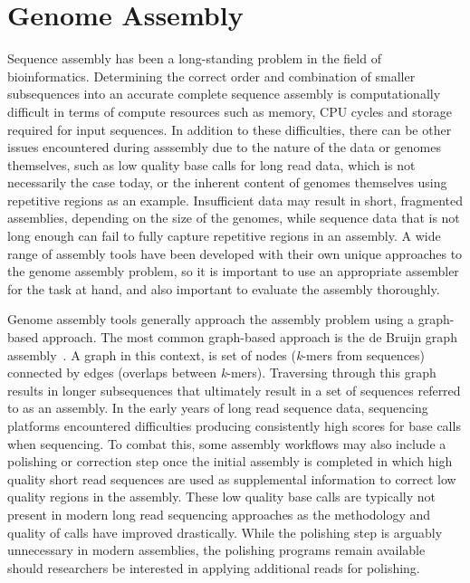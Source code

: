 \section{Genome Assembly}

Sequence assembly has been a long-standing problem in the field of
bioinformatics\cite{Nagarajan2013}. Determining the correct order and
combination of smaller subsequences into an accurate complete sequence
assembly is computationally difficult in terms of compute resources
such as memory, CPU cycles and storage required for input
sequences\cite{Nagarajan2013}. In addition to these difficulties,
there can be other issues encountered during asssembly due to the
nature of the data or genomes themselves, such as low quality base
calls for long read data, which is not necessarily the case today, or
the inherent content of genomes themselves using repetitive regions as
an example. Insufficient data may result in short, fragmented
assemblies, depending on the size of the genomes, while sequence data
that is not long enough can fail to fully capture repetitive regions
in an assembly. A wide range of assembly tools have been developed
with their own unique approaches to the genome assembly problem, so it
is important to use an appropriate assembler for the task at hand, and
also important to evaluate the assembly thoroughly.

Genome assembly tools generally approach the assembly problem using a
graph-based approach. The most common graph-based approach is the de
Bruijn graph assembly~\cite{Compeau2011}. A graph in this context, is
set of nodes (\textit{k}-mers from sequences) connected by edges
(overlaps between \textit{k}-mers). Traversing through this graph
results in longer subsequences that ultimately result in a set of
sequences referred to as an assembly. In the early years of long read
sequence data, sequencing platforms encountered difficulties producing
consistently high scores for base calls when sequencing. To combat
this, some assembly workflows may also include a polishing or
correction step once the initial assembly is completed in which high
quality short read sequences are used as supplemental information to
correct low quality regions in the assembly. These low quality base
calls are typically not present in modern long read sequencing
approaches as the methodology and quality of calls have improved
drastically. While the polishing step is arguably unnecessary in
modern assemblies, the polishing programs remain available should
researchers be interested in applying additional reads for polishing.

